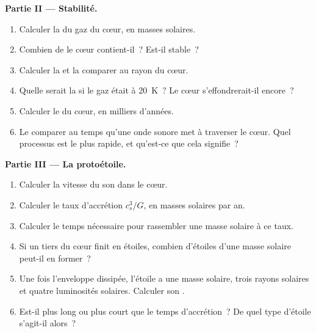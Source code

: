 \begin{problem}
\noindent\textbf{Partie II --- Stabilité.}
\begin{enumerate}[resume]
  \item Calculer la  du gaz du cœur, en masses solaires.
  \item Combien de  le cœur contient-il~? Est-il stable~?
  \item Calculer la  et la comparer au rayon du cœur.
  \item Quelle serait la  si le gaz était à \qty{20}{K}~? Le cœur
        s'effondrerait-il encore~?
  \item Calculer le  du cœur, en milliers d'années.
  \item Le comparer au temps qu'une onde sonore met à traverser le cœur. Quel
        processus est le plus rapide, et qu'est-ce que cela signifie~?
\end{enumerate}

\noindent\textbf{Partie III --- La protoétoile.}
\begin{enumerate}[resume]
  \item Calculer la vitesse du son dans le cœur.
  \item Calculer le taux d'accrétion $c_s^3/G$, en masses solaires par an.
  \item Calculer le temps nécessaire pour rassembler une masse solaire à ce taux.
  \item Si un tiers du cœur finit en étoiles, combien d'étoiles d'une masse solaire
        peut-il en former~?
  \item Une fois l'enveloppe dissipée, l'étoile a une masse solaire, trois rayons
        solaires et quatre luminosités solaires. Calculer son .
  \item Est-il plus long ou plus court que le temps d'accrétion~? De quel type d'étoile
        s'agit-il alors~?
\end{enumerate}


\end{problem}
